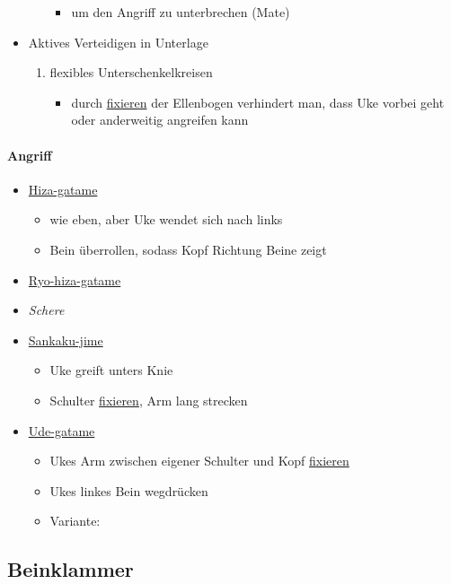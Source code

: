 \documentclass[justified, a4paper, notitlepage, captions=tableheading, nobib]{tufte-handout}
\begin{document}
\begin{itemize}
\begin{enumerate}
\begin{itemize}
\item um den Angriff zu unterbrechen (Mate)
\end{itemize}
\end{enumerate}
\item Aktives Verteidigen in Unterlage
\begin{enumerate}
\item flexibles Unterschenkelkreisen
\begin{itemize}
\item durch \hyperref[org62822f6]{fixieren} der Ellenbogen verhindert man, dass Uke vorbei geht oder anderweitig angreifen kann
\end{itemize}
\end{enumerate}
\end{itemize}

\paragraph{Angriff}
\label{sec:orgec488d4}
\begin{itemize}
\item \hyperref[org937174c]{Hiza-gatame} \citep[S. 143]{komuro2011komlock}
\begin{itemize}
\item wie eben, aber Uke wendet sich nach links
\item Bein überrollen, sodass Kopf Richtung Beine zeigt
\end{itemize}
\item \hyperref[org5a19c66]{Ryo-hiza-gatame}
\item \emph{Schere}
\item \hyperref[orgb11245f]{Sankaku-jime}
\begin{itemize}
\item Uke greift unters Knie
\item Schulter \hyperref[org62822f6]{fixieren}, Arm lang strecken
\end{itemize}
\item \hyperref[org7d0d631]{Ude-gatame}
\begin{itemize}
\item Ukes Arm zwischen eigener Schulter und Kopf \hyperref[org62822f6]{fixieren}
\item Ukes linkes Bein wegdrücken
\item Variante:  \citep[S. 43]{kashiwazaki2012einführung}
\end{itemize}
\end{itemize}

\subsection{\label{org8562ca1}Beinklammer }
\label{sec:orgab08af1}
\end{document}
